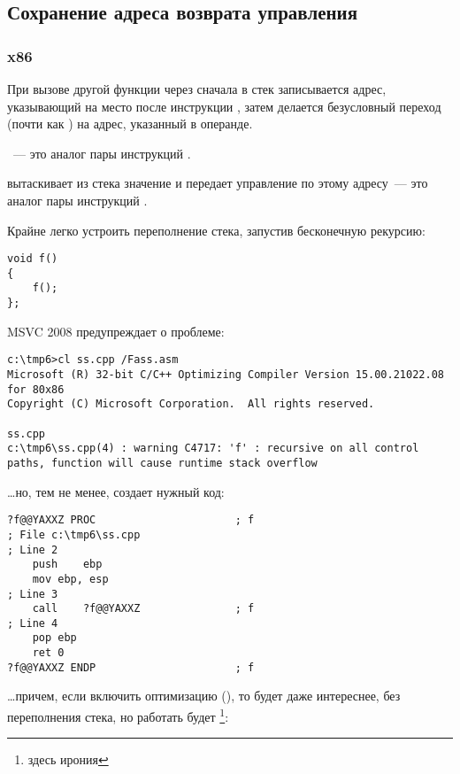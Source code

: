 \subsection{Сохранение адреса возврата управления}

\subsubsection{x86}

При вызове другой функции через \CALL сначала в стек записывается адрес, указывающий на место после 
инструкции \CALL, затем делается безусловный переход (почти как ) на адрес, указанный в операнде.

\CALL~--- это аналог пары инструкций .

\RET вытаскивает из стека значение и передает управление по этому адресу~--- 
это аналог пары инструкций .

\myindex{\Recursion}
Крайне легко устроить переполнение стека, запустив бесконечную рекурсию:

\begin{lstlisting}
void f()
{
	f();
};
\end{lstlisting}

MSVC 2008 предупреждает о проблеме:

\begin{lstlisting}
c:\tmp6>cl ss.cpp /Fass.asm
Microsoft (R) 32-bit C/C++ Optimizing Compiler Version 15.00.21022.08 for 80x86
Copyright (C) Microsoft Corporation.  All rights reserved.

ss.cpp
c:\tmp6\ss.cpp(4) : warning C4717: 'f' : recursive on all control paths, function will cause runtime stack overflow
\end{lstlisting}

\dots но, тем не менее, создает нужный код:

\begin{lstlisting}
?f@@YAXXZ PROC						; f
; File c:\tmp6\ss.cpp
; Line 2
	push	ebp
	mov	ebp, esp
; Line 3
	call	?f@@YAXXZ				; f
; Line 4
	pop	ebp
	ret	0
?f@@YAXXZ ENDP						; f
\end{lstlisting}

\dots причем, если включить оптимизацию (\TT{\Ox}), то будет даже интереснее, без переполнения стека, 
но работать будет \footnote{здесь ирония}:


